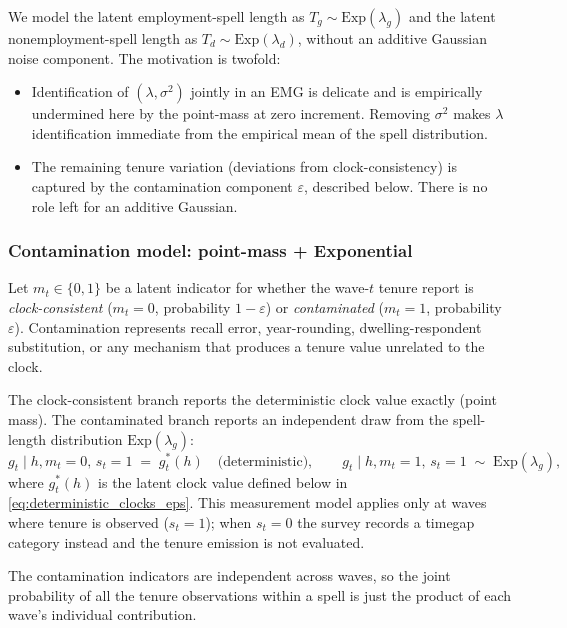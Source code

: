 We model the latent employment-spell length as \(T_g \sim \mathrm{Exp}(\lambda_g)\)
and the latent nonemployment-spell length as \(T_d \sim \mathrm{Exp}(\lambda_d)\),
without an additive Gaussian noise component. The motivation is twofold:

\begin{itemize}
\item Identification of \((\lambda,\sigma^2)\) jointly in an EMG is delicate
  and is empirically undermined here by the point-mass at zero increment.
  Removing \(\sigma^2\) makes \(\lambda\) identification immediate from the
  empirical mean of the spell distribution.
\item The remaining tenure variation (deviations from clock-consistency)
  is captured by the contamination component \(\varepsilon\), described
  below. There is no role left for an additive Gaussian.
\end{itemize}

\subsubsection{Contamination model: point-mass + Exponential}

Let \(m_{t} \in \{0,1\}\) be a latent indicator for whether the wave-\(t\)
tenure report is \emph{clock-consistent}
(\(m_{t} = 0\), probability \(1-\varepsilon\)) or \emph{contaminated}
(\(m_{t} = 1\), probability \(\varepsilon\)). Contamination represents
recall error, year-rounding, dwelling-respondent substitution, or any
mechanism that produces a tenure value unrelated to the clock.

The clock-consistent branch reports the deterministic clock value exactly
(point mass). The contaminated branch reports an independent draw from the
spell-length distribution \(\mathrm{Exp}(\lambda_g)\):
\begin{equation}
g_{t} \mid h, m_{t}=0,\, s_{t}=1 \;=\; g^*_{t}(h) \quad\text{(deterministic)},
\qquad
g_{t} \mid h, m_{t}=1,\, s_{t}=1 \;\sim\; \mathrm{Exp}(\lambda_g),
\label{eq:eps_branch}
\end{equation}
where \(g^*_{t}(h)\) is the latent clock value defined below in
\eqref{eq:deterministic_clocks_eps}. This measurement model applies only
at waves where tenure is observed (\(s_{t}=1\)); when \(s_{t}=0\) the
survey records a timegap category instead and the tenure emission is not
evaluated.

The contamination indicators are independent across waves, so the joint 
probability of all the tenure observations within a spell is just the 
product of each wave's individual contribution.


